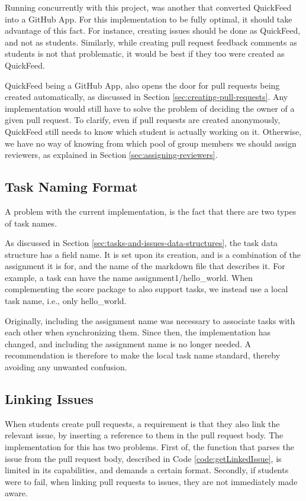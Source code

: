 Running concurrently with this project, was another that converted QuickFeed into a GitHub App.
For this implementation to be fully optimal, it should take advantage of this fact.
For instance, creating issues should be done as QuickFeed, and not as students.
Similarly, while creating pull request feedback comments as students is not that problematic, it would be best if they too were created as QuickFeed.

QuickFeed being a GitHub App, also opens the door for pull requests being created automatically, as discussed in Section \ref{sec:creating-pull-requests}.
Any implementation would still have to solve the problem of deciding the owner of a given pull request.
To clarify, even if pull requests are created anonymously, QuickFeed still needs to know which student is actually working on it.
Otherwise, we have no way of knowing from which pool of group members we should assign reviewers, as explained in Section \ref{sec:assigning-reviewers}.

\subsection{Task Naming Format}

A problem with the current implementation, is the fact that there are two types of task names.

As discussed in Section \ref{sec:tasks-and-issues-data-structures}, the task data structure has a field name.
It is set upon its creation, and is a combination of the assignment it is for, and the name of the markdown file that describes it.
For example, a task can have the name assignment1/hello\_world.
When complementing the score package to also support tasks, we instead use a local task name, i.e., only hello\_world.

Originally, including the assignment name was necessary to associate tasks with each other when synchronizing them.
Since then, the implementation has changed, and including the assignment name is no longer needed.
A recommendation is therefore to make the local task name standard, thereby avoiding any unwanted confusion.

\subsection{Linking Issues}

When students create pull requests, a requirement is that they also link the relevant issue, by inserting a reference to them in the pull request body.
The implementation for this has two problems.
First of, the function that parses the issue from the pull request body, described in Code \ref{code:getLinkedIssue}, is limited in its capabilities, and demands a certain format.
Secondly, if students were to fail, when linking pull requests to issues, they are not immediately made aware.

